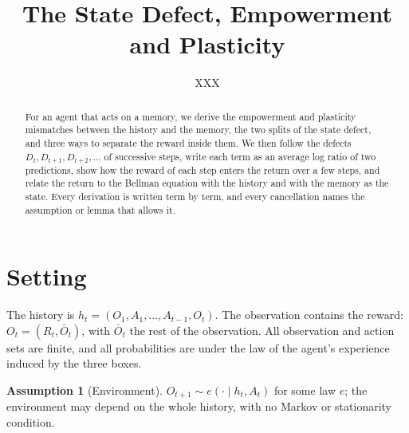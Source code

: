 \documentclass{article}
\title{The State Defect, Empowerment and Plasticity}
\author{XXX}
\theoremstyle{definition}
\newtheorem{assumption}{Assumption}
\theoremstyle{remark}
\newcommand{\Ob}{\bar O}
\begin{document}
\maketitle

\begin{abstract}
For an agent that acts on a memory, we derive the empowerment and plasticity mismatches between the history and the memory, the two splits of the state defect, and three ways to separate the reward inside them. We then follow the defects $D_t,D_{t+1},D_{t+2},\dots$ of successive steps, write each term as an average log ratio of two predictions, show how the reward of each step enters the return over a few steps, and relate the return to the Bellman equation with the history and with the memory as the state. Every derivation is written term by term, and every cancellation names the assumption or lemma that allows it.
\end{abstract}

\section{Setting}\label{sec:setting}

\begin{center}
\end{center}

The history is $h_t=(O_1,A_1,\dots,A_{t-1},O_t)$. The observation contains the reward: $O_t=(R_t,\Ob_t)$, with $\Ob_t$ the rest of the observation. All observation and action sets are finite, and all probabilities are under the law of the agent's experience induced by the three boxes.

\begin{assumption}[Environment]\label{as:env}
$O_{t+1}\sim e(\cdot\mid h_t,A_t)$ for some law $e$; the environment may depend on the whole history, with no Markov or stationarity condition.
\end{assumption}
\end{document}
